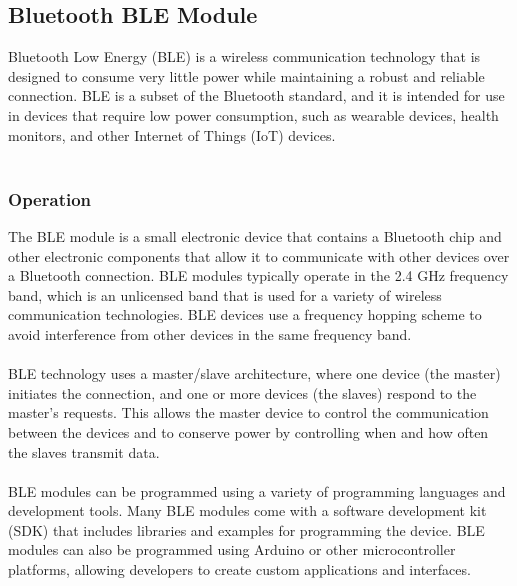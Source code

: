 \documentclass[12pt]{article}
\begin{document}
\subsection{Bluetooth BLE Module}
Bluetooth Low Energy (BLE) is a wireless communication technology that is designed to consume very little power while maintaining a robust and reliable connection. BLE is a subset of the Bluetooth standard, and it is intended for use in devices that require low power consumption, such as wearable devices, health monitors, and other Internet of Things (IoT) devices.
\\
\\
\subsubsection{Operation}
The BLE module is a small electronic device that contains a Bluetooth chip and other electronic components that allow it to communicate with other devices over a Bluetooth connection. BLE modules typically operate in the 2.4 GHz frequency band, which is an unlicensed band that is used for a variety of wireless communication technologies. BLE devices use a frequency hopping scheme to avoid interference from other devices in the same frequency band.
\\
\\
BLE technology uses a master/slave architecture, where one device (the master) initiates the connection, and one or more devices (the slaves) respond to the master's requests. This allows the master device to control the communication between the devices and to conserve power by controlling when and how often the slaves transmit data.
\\
\\
BLE modules can be programmed using a variety of programming languages and development tools. Many BLE modules come with a software development kit (SDK) that includes libraries and examples for programming the device. BLE modules can also be programmed using Arduino or other microcontroller platforms, allowing developers to create custom applications and interfaces.
\\
\\
\end{document}
